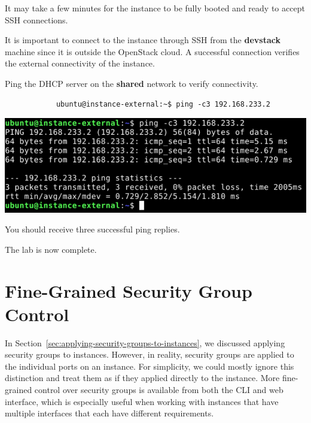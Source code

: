 \documentclass[letterpaper, 12pt]{article}
\begin{document}
\begin{enumerate}
    \begin{notebox}
        It may take a few minutes for the instance to be fully booted and ready to accept SSH connections.
    \end{notebox}
    \begin{notebox}
        It is important to connect to the instance through SSH from the \textbf{devstack} machine since it is outside the OpenStack cloud.
        A successful connection verifies the external connectivity of the instance.
    \end{notebox}

    \begin{labstep}
        Ping the DHCP server on the \textbf{shared} network to verify connectivity.
        \begin{lstlisting}
            ubuntu@instance-external:~$ ping -c3 192.168.233.2
        \end{lstlisting}

        \begin{center}
            \includegraphics[width=\linewidth]{images/part9/step42.png}
        \end{center}
    \end{labstep}

    \begin{notebox}
        You should receive three successful ping replies.
    \end{notebox}

    \begin{labstep}
        The lab is now complete.
    \end{labstep}

\end{enumerate}

\appendix
\section{Fine-Grained Security Group Control}
In Section~\ref{sec:applying-security-groups-to-instances}, we discussed applying security groups to instances.
However, in reality, security groups are applied to the individual ports on an instance.
For simplicity, we could mostly ignore this distinction and treat them as if they applied directly to the instance.
More fine-grained control over security groups is available from both the CLI and web interface, which is especially useful when working with instances that have multiple interfaces that each have different requirements.
\end{document}
